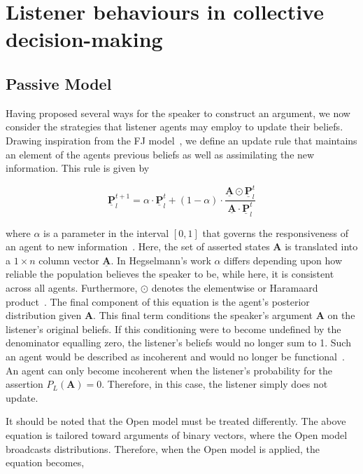 \section{Listener behaviours in collective decision-making} \label{sect:listener_models}

\subsection*{Passive Model}
Having proposed several ways for the speaker to construct an argument, we now consider the strategies that listener agents may employ to update their beliefs. Drawing inspiration from the FJ model~\cite{Friedkin1999SocialChange}, we define an update rule that maintains an element of the agents previous beliefs as well as assimilating the new information. This rule is given by

\begin{equation} \label{eq:BU_update_rule}
    \underline{\mathbf{P}}^{t+1}_l = \alpha \cdot \underline{\mathbf{P}}^{t}_l + (1 - \alpha) \cdot  \frac{\underline{\mathbf{A}} \odot \underline{\mathbf{P}}^t_l}{\underline{\mathbf{A}} \cdot \underline{\mathbf{P}}^t_l}
\end{equation}

where $\alpha$ is a parameter in the interval $[0, 1]$ that governs the responsiveness of an agent to new information~\cite{Hegselmann2002OpinionSimulation}. Here, the set of asserted states $\mathbf{A}$ is translated into a $1 \times n$ column vector $\underline{\mathbf{A}}$. In Hegselmann's work $\alpha$ differs depending upon how reliable the population believes the speaker to be, while here, it is consistent across all agents. Furthermore, $\odot$ denotes the elementwise or Haramaard product~\cite{Johnson1990MatrixApplications}. The final component of this equation is the agent's posterior distribution given $\mathbf{A}$. This final term conditions the speaker's argument $\mathbf{A}$ on the listener's original beliefs. If this conditioning were to become undefined by the denominator equalling zero, the listener's beliefs would no longer sum to 1. Such an agent would be described as incoherent and would no longer be functional~\cite{Lee2018CombiningConsensus}. An agent can only become incoherent when the listener's probability for the assertion $P_L(\mathbf{A}) = 0$. Therefore, in this case, the listener simply does not update.

It should be noted that the Open model must be treated differently. The above equation is tailored toward arguments of binary vectors, where the Open model broadcasts distributions. Therefore, when the Open model is applied, the equation becomes,

